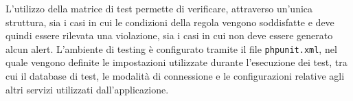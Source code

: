 L'utilizzo della matrice di test permette di verificare, attraverso un'unica struttura, sia i casi in cui le condizioni della regola vengono soddisfatte e deve quindi essere 
rilevata una violazione, sia i casi in cui non deve essere generato alcun alert.
\newline
L'ambiente di testing è configurato tramite il file \texttt{phpunit.xml}, nel quale vengono definite le impostazioni utilizzate durante l'esecuzione dei test, tra cui il database 
di test, le modalità di connessione e le configurazioni relative agli altri servizi utilizzati dall'applicazione.

\begin{listing}[H]
\captionsetup{type=listing, belowskip=0pt}
\inputminted[fontsize=\small, breaklines, breakanywhere=true, linenos=true, bgcolor=gray!10]{php}{code/test.php}
\caption{Esempio di una funzione di test per la regola BuyOrdersRule}
\label{listing:php_test}
\end{listing}

